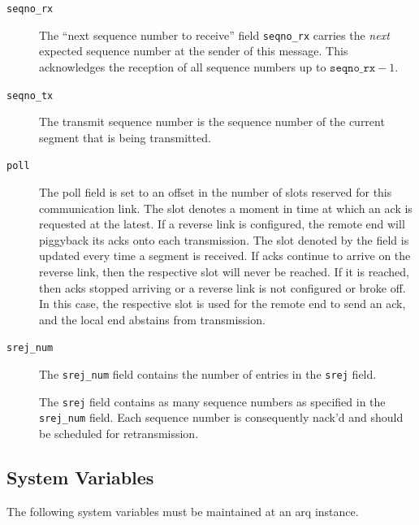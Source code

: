 \documentclass[a4paper]{article}
\renewcommand{\quote}[1]{``#1''}
\newcommand{\nr}{\texttt{seqno\_{}rx}}
\newcommand{\ns}{\texttt{seqno\_{}tx}}
\newcommand{\poll}{\texttt{poll}}
\newcommand{\srej}{\texttt{srej}}
\newcommand{\srejnum}{\texttt{srej\_{}num}}
\begin{document}
		\begin{description}
			\item[\nr{}] The \quote{next sequence number to receive} field \nr{} carries the \emph{next} expected sequence number at the sender of this message.
			This acknowledges the reception of all sequence numbers up to $\nr{}-1$.
			
			\item[\ns{}] The transmit sequence number is the sequence number of the current segment that is being transmitted.
			
			\item[\poll{}] The poll field is set to an offset in the number of slots reserved for this communication link.
			The slot denotes a moment in time at which an \ac{ack} is requested at the latest.
			If a reverse link is configured, the remote end will piggyback its \acp{ack} onto each transmission.
			The slot denoted by the field is updated every time a segment is received.
			If \acp{ack} continue to arrive on the reverse link, then the respective slot will never be reached.
			If it is reached, then \acp{ack} stopped arriving or a reverse link is not configured or broke off.
			In this case, the respective slot is used for the remote end to send an \ac{ack}, and the local end abstains from transmission.	
			
			\item[\srejnum{}] The \texttt{srej\_{}num} field contains the number of entries in the \srej{} field.
			
			\item[] The \srej{} field contains as many sequence numbers as specified in the \texttt{srej\_{}num} field.
			Each sequence number is consequently \ac{nack}'d and should be scheduled for retransmission.
		\end{description}
		
	\subsection{System Variables}\label{sec:arq_variables}		
		The following system variables must be maintained at an \ac{arq} instance.			
		
\end{document}
